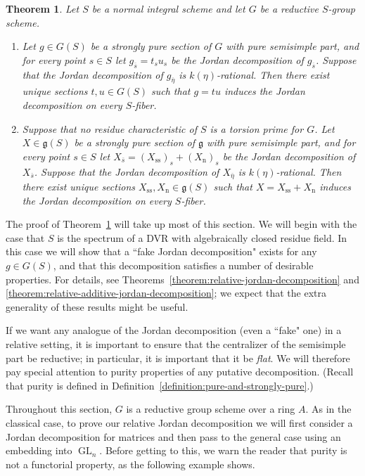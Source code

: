 \documentclass[11pt,reqno]{amsart}
\newtheorem{theorem}{Theorem}[section]
\theoremstyle{definition}
\renewcommand{\rm}{\mathrm}
\newcommand{\fg}{\mathfrak{g}}
\DeclareMathOperator{\GL}{GL}
\begin{document}
\begin{theorem}\label{theorem:relative-jordan-decomposition-over-normal-base}
Let $S$ be a normal integral scheme and let $G$ be a reductive $S$-group scheme.
\begin{enumerate}
    \item Let $g \in G(S)$ be a strongly pure section of $G$ with pure semisimple part, and for every point $s \in S$ let $g_{\overline{s}} = t_s u_s$ be the Jordan decomposition of $g_{\overline{s}}$. Suppose that the Jordan decomposition of $g_{\overline{\eta}}$ is $k(\eta)$-rational. Then there exist unique sections $t, u \in G(S)$ such that $g = tu$ induces the Jordan decomposition on every $S$-fiber.
    \item Suppose that no residue characteristic of $S$ is a torsion prime for $G$. Let $X \in \fg(S)$ be a strongly pure section of $\fg$ with pure semisimple part, and for every point $s \in S$ let $X_{\overline{s}} = (X_{\rm{ss}})_s + (X_{\rm{n}})_s$ be the Jordan decomposition of $X_{\overline{s}}$. Suppose that the Jordan decomposition of $X_{\overline{\eta}}$ is $k(\eta)$-rational. Then there exist unique sections $X_{\rm{ss}}, X_{\rm{n}} \in \fg(S)$ such that $X = X_{\rm{ss}} + X_{\rm{n}}$ induces the Jordan decomposition on every $S$-fiber.
\end{enumerate}
\end{theorem}

The proof of Theorem~\ref{theorem:relative-jordan-decomposition-over-normal-base} will take up most of this section. We will begin with the case that $S$ is the spectrum of a DVR with algebraically closed residue field. In this case we will show that a ``fake Jordan decomposition" exists for any $g \in G(S)$, and that this decomposition satisfies a number of desirable properties. For details, see Theorems~\ref{theorem:relative-jordan-decomposition} and \ref{theorem:relative-additive-jordan-decomposition}; we expect that the extra generality of these results might be useful.\smallskip

If we want any analogue of the Jordan decomposition (even a ``fake" one) in a relative setting, it is important to ensure that the centralizer of the semisimple part be reductive; in particular, it is important that it be \textit{flat}. We will therefore pay special attention to purity properties of any putative decomposition. (Recall that purity is defined in Definition~\ref{definition:pure-and-strongly-pure}.) \smallskip

Throughout this section, $G$ is a reductive group scheme over a ring $A$. As in the classical case, to prove our relative Jordan decomposition we will first consider a Jordan decomposition for matrices and then pass to the general case using an embedding into $\GL_n$. Before getting to this, we warn the reader that purity is not a functorial property, as the following example shows.
\end{document}
